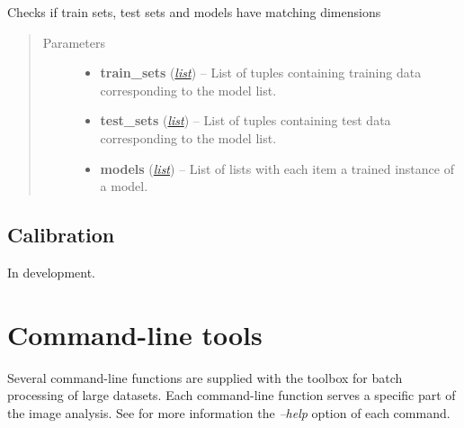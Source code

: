 \documentclass[letterpaper,10pt,english]{sphinxmanual}
\begin{document}
\begin{fulllineitems}
\label{classification:flamingo.classification.utils.check_sets}
Checks if train sets, test sets and models have matching dimensions
\begin{quote}\begin{description}
\item[{Parameters}] \leavevmode\begin{itemize}
\item {} 
\textbf{train\_sets} (\href{http://docs.python.org/library/functions.html\#list}{\emph{list}}) -- List of tuples containing training data corresponding to the model list.

\item {} 
\textbf{test\_sets} (\href{http://docs.python.org/library/functions.html\#list}{\emph{list}}) -- List of tuples containing test data corresponding to the model list.

\item {} 
\textbf{models} (\href{http://docs.python.org/library/functions.html\#list}{\emph{list}}) -- List of lists with each item a trained instance of a model.

\end{itemize}

\end{description}\end{quote}

\end{fulllineitems}



\section{Calibration}
\label{calibration::doc}\label{calibration:calibration}
In development.


\chapter{Command-line tools}
\label{index:command-line-tools}
Several command-line functions are supplied with the toolbox for batch processing of large datasets.
Each command-line function serves a specific part of the image analysis.
See for more information the \emph{--help} option of each command.
\end{document}
